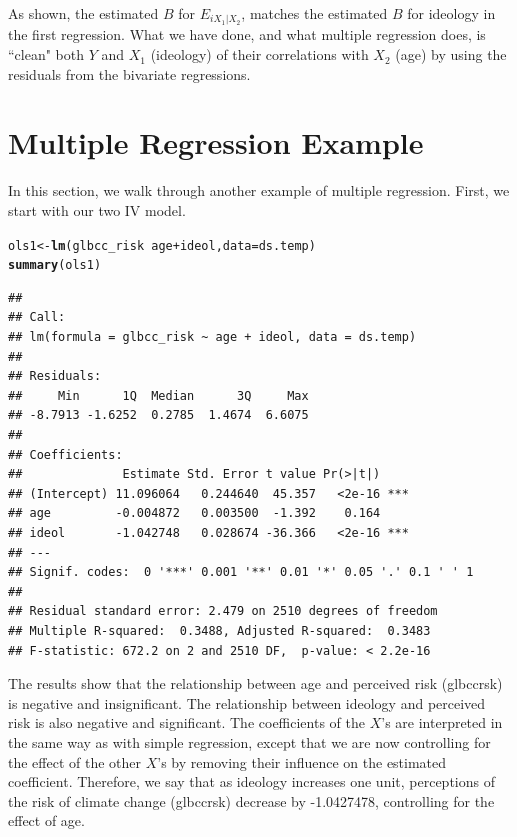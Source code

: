 \documentclass[11pt,openany]{book}\usepackage[]{graphicx}\usepackage[]{color}
\makeatletter
\newcommand{\hlopt}[1]{\textcolor[rgb]{0,0,0}{#1}}%
\newcommand{\hlstd}[1]{\textcolor[rgb]{0.345,0.345,0.345}{#1}}%
\newcommand{\hlkwb}[1]{\textcolor[rgb]{0.69,0.353,0.396}{#1}}%
\newcommand{\hlkwc}[1]{\textcolor[rgb]{0.333,0.667,0.333}{#1}}%
\newcommand{\hlkwd}[1]{\textcolor[rgb]{0.737,0.353,0.396}{\textbf{#1}}}%
\newenvironment{kframe}{%
 \def\at@end@of@kframe{}%
 \ifinner\ifhmode%
  \def\at@end@of@kframe{\end{minipage}}%
  \begin{minipage}{\columnwidth}%
 \fi\fi%
 \def\FrameCommand##1{\hskip\@totalleftmargin \hskip-\fboxsep
 \colorbox{shadecolor}{##1}\hskip-\fboxsep
     \hskip-\linewidth \hskip-\@totalleftmargin \hskip\columnwidth}%
 \MakeFramed {\advance\hsize-\width
   \@totalleftmargin\z@ \linewidth\hsize
   \@setminipage}}%
 {\par\unskip\endMakeFramed%
 \at@end@of@kframe}
\newenvironment{knitrout}{}{} %
\renewenvironment{knitrout}{\begin{singlespace}}{\end{singlespace}}
\makeatother
\begin{document}
As shown, the estimated $B$ for $E_{iX_{1}|X_{2}}$, matches the estimated $B$ for ideology in the first regression. What we have done, and what multiple regression does, is ``clean" both $Y$ and $X_1$ (ideology) of their correlations with $X_2$ (age) by using the residuals from the bivariate regressions.
 
\section{Multiple Regression Example}



In this section, we walk through another example of multiple regression. First, we start with our two IV model. 
\begin{knitrout}
\color{fgcolor}\begin{kframe}
\begin{alltt}
\hlstd{ols1} \hlkwb{<-} \hlkwd{lm}\hlstd{(glbcc_risk} \hlopt{~} \hlstd{age} \hlopt{+} \hlstd{ideol,} \hlkwc{data} \hlstd{= ds.temp)}
\hlkwd{summary}\hlstd{(ols1)}
\end{alltt}
\begin{verbatim}
## 
## Call:
## lm(formula = glbcc_risk ~ age + ideol, data = ds.temp)
## 
## Residuals:
##     Min      1Q  Median      3Q     Max 
## -8.7913 -1.6252  0.2785  1.4674  6.6075 
## 
## Coefficients:
##              Estimate Std. Error t value Pr(>|t|)    
## (Intercept) 11.096064   0.244640  45.357   <2e-16 ***
## age         -0.004872   0.003500  -1.392    0.164    
## ideol       -1.042748   0.028674 -36.366   <2e-16 ***
## ---
## Signif. codes:  0 '***' 0.001 '**' 0.01 '*' 0.05 '.' 0.1 ' ' 1
## 
## Residual standard error: 2.479 on 2510 degrees of freedom
## Multiple R-squared:  0.3488,	Adjusted R-squared:  0.3483 
## F-statistic: 672.2 on 2 and 2510 DF,  p-value: < 2.2e-16
\end{verbatim}
\end{kframe}
\end{knitrout}

The results show that the relationship between age and perceived risk (glbccrsk) is negative and insignificant. The relationship between ideology and perceived risk is also negative and significant. The coefficients of the $X$'s are interpreted in the same way as with simple regression, except that we are now controlling for the effect of the other $X$'s by removing their influence on the estimated coefficient. Therefore, we say that as ideology increases one unit, perceptions of the risk of climate change (glbccrsk) decrease by -1.0427478, controlling for the effect of age.  
\end{document}
